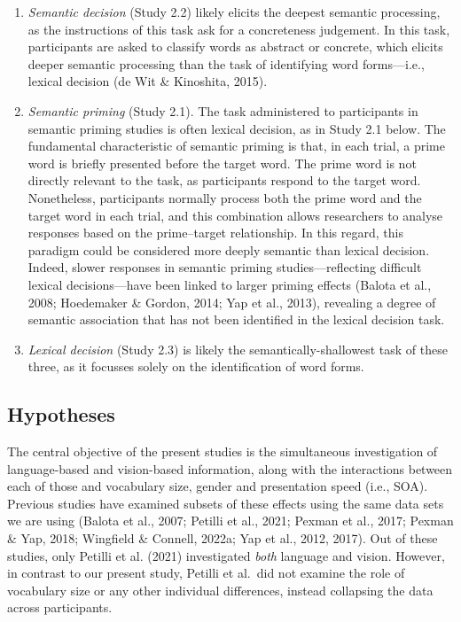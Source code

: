 \documentclass[
  12pt,
  man,floatsintext]{apa7}
\begin{document}
\begin{enumerate}
\def\labelenumi{\arabic{enumi}.}
\item
  \emph{Semantic decision} (Study 2.2) likely elicits the deepest semantic processing, as the instructions of this task ask for a concreteness judgement. In this task, participants are asked to classify words as abstract or concrete, which elicits deeper semantic processing than the task of identifying word forms---i.e., lexical decision (de Wit \& Kinoshita, 2015).
\item
  \emph{Semantic priming} (Study 2.1). The task administered to participants in semantic priming studies is often lexical decision, as in Study 2.1 below. The fundamental characteristic of semantic priming is that, in each trial, a prime word is briefly presented before the target word. The prime word is not directly relevant to the task, as participants respond to the target word. Nonetheless, participants normally process both the prime word and the target word in each trial, and this combination allows researchers to analyse responses based on the prime--target relationship. In this regard, this paradigm could be considered more deeply semantic than lexical decision. Indeed, slower responses in semantic priming studies---reflecting difficult lexical decisions---have been linked to larger priming effects (Balota et al., 2008; Hoedemaker \& Gordon, 2014; Yap et al., 2013), revealing a degree of semantic association that has not been identified in the lexical decision task.
\item
  \emph{Lexical decision} (Study 2.3) is likely the semantically-shallowest task of these three, as it focusses solely on the identification of word forms.
\end{enumerate}

\hypertarget{hypotheses}{%
\subsection{Hypotheses}\label{hypotheses}}

The central objective of the present studies is the simultaneous investigation of language-based and vision-based information, along with the interactions between each of those and vocabulary size, gender and presentation speed (i.e., SOA). Previous studies have examined subsets of these effects using the same data sets we are using (Balota et al., 2007; Petilli et al., 2021; Pexman et al., 2017; Pexman \& Yap, 2018; Wingfield \& Connell, 2022a; Yap et al., 2012, 2017). Out of these studies, only Petilli et al. (2021) investigated \emph{both} language and vision. However, in contrast to our present study, Petilli et al.~did not examine the role of vocabulary size or any other individual differences, instead collapsing the data across participants.
\end{document}
